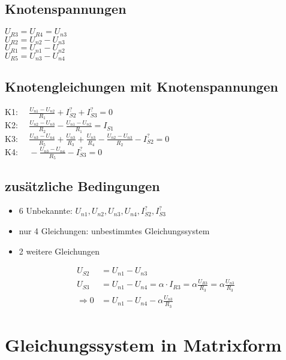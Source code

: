 \documentclass[11pt]{scrartcl}
\begin{document}
\subsection{Knotenspannungen}
\begin{doublespace}
\(\displaystyle U_{R3} = U_{R4} = U_{n3}\) \\
\(\displaystyle U_{R2} = U_{n2}- U_{n3}\) \\
\(\displaystyle U_{R1} = U_{n1}- U_{n2}\) \\
\(\displaystyle U_{R5} = U_{n3}- U_{n4}\)
\end{doublespace}

\subsection{Knotengleichungen mit Knotenspannungen}
\begin{spacing}{2.5}
  K1: \(\displaystyle \quad \frac{U_{n1} - U_{n2}}{R_1} + I_{S2}^? + I_{S3}^? = 0\) \\
  K2: \(\displaystyle \quad \frac{U_{n2} - U_{n3}}{R_2} - \frac{U_{n1} - U_{n2}}{R_1} = I_{S1}\) \\
  K3: \(\displaystyle \quad \frac{U_{n3} - U_{n4}}{R_5} + \frac{U_{n3}}{R_3} + \frac{U_{n3}}{R_4} - \frac{U_{n2} - U_{n3}}{R_2} - I_{S2}^?= 0\) \\
  K4: \(\displaystyle \quad - \frac{U_{n3} - U_{n4}}{R_5} - I_{S3}^? = 0\)
\end{spacing}
\subsection{zusätzliche Bedingungen}
\begin{itemize}
\item 6 Unbekannte: $U_{n1}, U_{n2}, U_{n3}, U_{n4}, I_{S2}^?, I_{S3}^?$
\item nur 4 Gleichungen: unbestimmtes Gleichungssystem
\item 2 weitere Gleichungen
\end{itemize}
\begin{align}
  U_{S2} &= U_{n1} - U_{n3} \\
  U_{S3} &= U_{n1} - U_{n4} = \alpha \cdot I_{R3} = \alpha \frac{U_{R3}}{R_3} = \alpha \frac{U_{n3}}{R_3} \nonumber \\
  \Longrightarrow 0 &= U_{n1} - U_{n4} - \alpha \frac{U_{n3}}{R_3}
\end{align}


\section{Gleichungssystem in Matrixform}
\end{document}
